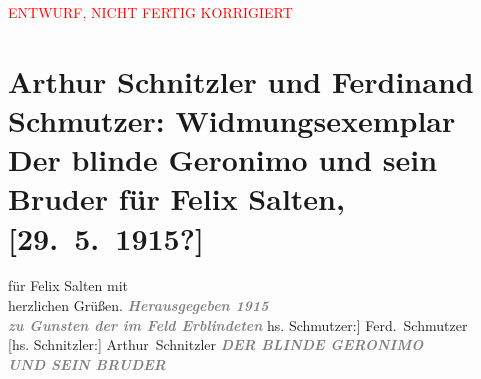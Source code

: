 
\begin{center}
            \textcolor{red}{ENTWURF, NICHT FERTIG KORRIGIERT}
                      \end{center}
            
         
         \renewcommand{\erwaehntePersonen}{Personen: Felix Salten, Ferdinand Schmutzer}
         \renewcommand{\erwaehnteInstitutionen}{Institutionen: S. Fischer Verlag}
         \renewcommand{\erwaehnteOrte}{Orte: Berlin, Wien}
         \renewcommand{\erwaehnteWerke}{Werke: Der blinde Geronimo und sein Bruder}
               \section[Arthur Schnitzler und Ferdinand Schmutzer: Widmungsexemplar Der blinde Geronimo und sein Bruder für Felix Salten, {[}29. 5. 1915?{]}]{ Arthur Schnitzler und Ferdinand Schmutzer: Widmungsexemplar Der blinde
               Geronimo und sein Bruder für Felix Salten, {[}29. 5. 1915?{]}}\nopagebreak{}\rehead{ }\begin{ledgroupsized}[t]{13cm}\normalsize\beginnumbering \toendnotes[C]{\smallbreak\pagebreak[2]} 
\toendnotes[C]{\smallbreak}\pstart
           \noindent{}\centering{}{\pb}für Felix Salten\pend
           \pstart
           \noindent{}\centering{}mit {\\}herzlichen Grüßen.\pend
           {\bigskip}\pstart
           \noindent{}\centering{}\textcolor{gray}{\textbf{\emph{Herausgegeben 1915}}}{\\}\textcolor{gray}{\textbf{\emph{zu Gunsten der im Feld Erblindeten}}}\pend
           {\bigskip}\pstart
           \noindent{}\centering{}{[}hs. Schmutzer:{]} \spacefill\mbox{Ferd. Schmutzer}{\\}{[}hs. Schnitzler:{]} \spacefill\mbox{Arthur Schnitzler}\pend
           {\bigskip}\pstart
           \noindent{}\centering{}{\pb}\textcolor{gray}{\textbf{\emph{DER BLINDE GERONIMO {\\}UND SEIN
                           BRUDER}}}\pend

\end{ledgroupsized}
